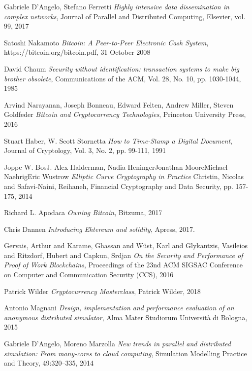\begin{thebibliography}{99}

 Gabriele D'Angelo, Stefano Ferretti
{\em Highly intensive data dissemination in complex networks},
Journal of Parallel and Distributed Computing, Elsevier, vol. 99, 2017

 Satoshi Nakamoto
{\em Bitcoin: A Peer-to-Peer Electronic Cash System},
https://bitcoin.org/bitcoin.pdf, 31 October 2008

 David Chaum
{\em Security without identification: transaction systems to make big brother obsolete},
Communications of the ACM, Vol. 28, No. 10, pp. 1030-1044, 1985

 Arvind Narayanan, Joseph Bonneau, Edward Felten, Andrew Miller, Steven Goldfeder
{\em Bitcoin and Cryptocurrency Technologies},
Princeton University Press, 2016

 Stuart Haber, W. Scott Stornetta
{\em How to Time-Stamp a Digital Document},
Journal of Cryptology, Vol. 3, No. 2, pp. 99-111, 1991

 Joppe W. BosJ. Alex Halderman, Nadia HeningerJonathan MooreMichael NaehrigEric Wustrow
{\em Elliptic Curve Cryptography in Practice}
Christin, Nicolas and Safavi-Naini, Reihaneh, Financial Cryptography and Data Security, pp. 157-175, 2014

 Richard L. Apodaca
{\em Owning Bitcoin},
Bitzuma, 2017

 Chris Dannen
{\em Introducing Ehtereum and solidity},
Apress, 2017.

 Gervais, Arthur and Karame, Ghassan and Wüst, Karl and Glykantzis, Vasileios and Ritzdorf, Hubert and Capkun, Srdjan
{\em On the Security and Performance of Proof of Work Blockchains},
Proceedings of the 23nd ACM SIGSAC Conference on Computer and Communication Security (CCS), 2016

 Patrick Wilder
{\em Cryptocurrency Masterclass},
Patrick Wilder, 2018

 Antonio Magnani
{\em Design, implementation and performance evaluation of an anonymous distributed simulator},
Alma Mater Studiorum Università di Bologna, 2015

 Gabriele D’Angelo, Moreno Marzolla
{\em New trends in parallel and distributed simulation: From many-cores to cloud computing},
Simulation Modelling Practice and Theory, 49:320–335, 2014


\end{thebibliography}
